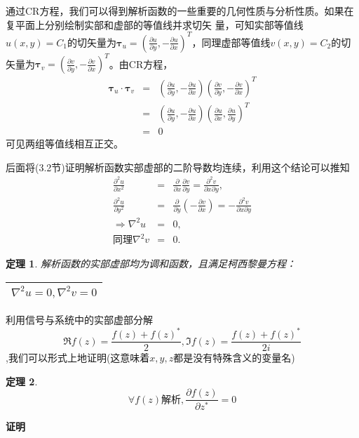 \documentclass[UTF8]{ctexart}
\newcommand{\tmmathbf}[1]{\ensuremath{\boldsymbol{#1}}}
\newtheorem{theorem}{定理}
\begin{document}
通过CR方程，我们可以得到解析函数的一些重要的几何性质与分析性质。如果在复平面上分别绘制实部和虚部的等值线并求切矢
量，可知实部等值线$u
(x, y) = C_1$的切矢量为$\tmmathbf{\tau}_u = \left( \frac{\partial
u}{\partial y}, - \frac{\partial u}{\partial x}
\right)^T$，同理虚部等值线$v (x, y) =
C_2$的切矢量为$\tmmathbf{\tau}_v = \left( \frac{\partial v}{\partial y},
- \frac{\partial v}{\partial x} \right)^T$。由CR方程，
\begin{eqnarray}
  \tmmathbf{\tau}_u \cdot \tmmathbf{\tau}_v & = & \left( \frac{\partial
  u}{\partial y}, - \frac{\partial u}{\partial x} \right) \left(
  \frac{\partial v}{\partial y}, - \frac{\partial v}{\partial x} \right)^T\\
  & = & \left( \frac{\partial u}{\partial y}, - \frac{\partial u}{\partial x}
  \right) \left( \frac{\partial u}{\partial x}, \frac{\partial u}{\partial y}
  \right)^T\\
  & = & 0
\end{eqnarray}
可见两组等值线相互正交。

后面将(3.2节)证明解析函数实部虚部的二阶导数均连续，利用这个结论可以推知
\begin{eqnarray}
  \frac{\partial^2 u}{\partial x^2} & = & \frac{\partial}{\partial x}
  \frac{\partial v}{\partial y} = \frac{\partial^2 v}{\partial x \partial
  y},\\
  \frac{\partial^2 u}{\partial y^2} & = & \frac{\partial}{\partial y} \left( -
  \frac{\partial v}{\partial x} \right) = - \frac{\partial^2 v}{\partial x
  \partial y}\\
  \Rightarrow \nabla^2 u & = & 0,\\
  同理 \nabla^2 v & = & 0.
\end{eqnarray}
\begin{theorem}
  解析函数的实部虚部均为调和函数，且满足柯西黎曼方程：

  \begin{center}
    \begin{tabular}{|c|}
      \hline
      $\nabla^2 u = 0, \nabla^2 v = 0$\\
      \hline
    \end{tabular}
  \end{center}
\end{theorem}

利用信号与系统中的实部虚部分解
\begin{equation}
  \Re f(z)=\frac{f(z)+f(z)^{*}}{2},\Im f(z)=\frac{f(z)+f(z)^{*}}{2i}
\end{equation}
,我们可以形式上地证明(这意味着$x,y,z$都是没有特殊含义的变量名)
\begin{theorem}
  \begin{equation}
    \forall f(z)\text{解析},\frac{\partial f(z)}{\partial z^{*}}=0
  \end{equation}
\end{theorem}
\textbf{证明}
\end{document}
